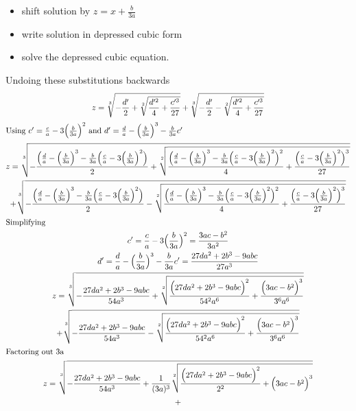 \documentclass[a4paper]{article}
\begin{document}
\begin{itemize}
  \item shift solution by $z=x + \frac{b}{3a}$
  \item write solution in depressed cubic form
  \item solve the depressed cubic equation.
\end{itemize}

Undoing these substitutions backwards
\begin{gather*}
  z = \sqrt[3]{-\frac{d'}{2} + \sqrt[2]{\frac{d'^2}{4} +\frac{c'^3}{27}}} + \sqrt[3]{-\frac{d'}{2} - \sqrt[2]{\frac{d'^2}{4} + \frac{c'^3}{27}}}
  \\
  \intertext{Using $ c' =  \frac{c}{a} - 3 \Big( \frac{b}{3a} \Big)^2 $
    and
    $d' =\frac{d}{a} - \Big( \frac{b}{3a} \Big)^3 - \frac{b}{3a} c' $}
  z = \sqrt[3]{-\frac{\Big( \frac{d}{a} - \Big( \frac{b}{3a} \Big)^3 - \frac{b}{3a} \Big( \frac{c}{a} - 3 \Big( \frac{b}{3a} \Big)^2 \Big)}{2} + \sqrt[2]{\frac{\Big(\frac{d}{a} - \Big( \frac{b}{3a} \Big)^3 - \frac{b}{3a} \Big( \frac{c}{a} - 3 \Big( \frac{b}{3a} \Big)^2 \Big)^2}{4} +\frac{\Big( \frac{c}{a} - 3 \Big( \frac{b}{3a} \Big)^2 \Big)^3}{27}}}
  \\
  +
  \sqrt[3]{-\frac{\Big( \frac{d}{a} - \Big( \frac{b}{3a} \Big)^3 - \frac{b}{3a} \Big( \frac{c}{a} - 3 \Big( \frac{b}{3a} \Big)^2 \Big)}{2} - \sqrt[2]{\frac{\Big(\frac{d}{a} - \Big( \frac{b}{3a} \Big)^3 - \frac{b}{3a} \Big( \frac{c}{a} - 3 \Big( \frac{b}{3a} \Big)^2 \Big)^2}{4} +\frac{\Big( \frac{c}{a} - 3 \Big( \frac{b}{3a} \Big)^2 \Big)^3}{27}}}
  \\
  \intertext{Simplifying}
  c' = \frac{c}{a} - 3 \Big( \frac{b}{3a} \Big)^2 =\frac{3ac - b^2}{3 a^2}
  \\
  d' = \frac{d}{a} - \Big( \frac{b}{3a} \Big)^3 - \frac{b}{3a} c' = \frac{27 d a^2 + 2 b^3 - 9abc}{27 a^3}
  \\
  z = \sqrt[3]{-\frac{27 d a^2 + 2 b^3 - 9abc}{54 a^3} + \sqrt[2]{\frac{\Big( 27 d a^2 + 2 b^3 - 9abc \Big)^2}{54^2 a^6} +  \frac{\Big (3ac - b^2 \Big)^3}{3^6 a^6}   }}
  \\
  +
  \sqrt[3]{-\frac{27 d a^2 + 2 b^3 - 9abc}{54 a^3} - \sqrt[2]{\frac{\Big( 27 d a^2 + 2 b^3 - 9abc \Big)^2}{54^2 a^6} + \frac{\Big (3ac - b^2 \Big)^3}{3^6 a^6}}}
  \\
  \intertext{Factoring out 3a}
  z = \sqrt[3]{-\frac{27 d a^2 + 2 b^3 - 9abc}{54 a^3} + \frac{1}{(3a)^3} \sqrt[2]{\frac{\Big( 27 d a^2 + 2 b^3 - 9abc \Big)^2}{2^2} + \Big (3ac - b^2 \Big)^3}}
  \\
  +

\end{gather*}
\end{document}
